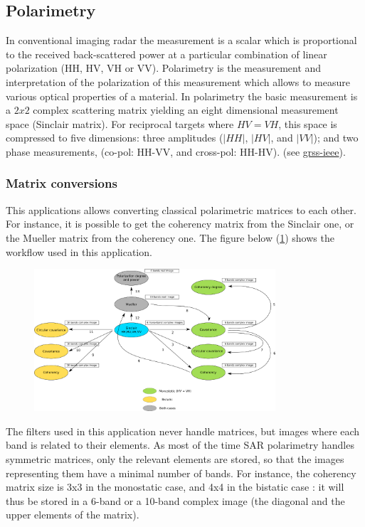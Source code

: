 \subsection{Polarimetry}

In conventional imaging radar the measurement is a scalar which is proportional
to the received back-scattered power at a particular combination of linear
polarization (HH, HV, VH or VV). 
Polarimetry is the measurement and interpretation of the polarization of this
measurement which allows to measure various optical properties of a material.
In polarimetry the basic measurement is a $2x2$ complex scattering matrix
yielding an eight dimensional measurement space (Sinclair matrix). For
reciprocal targets where $HV=VH$, this space is compressed to five dimensions:
three amplitudes ($|HH|$, $|HV|$, and $|VV|$); and two phase measurements,
(co-pol: HH-VV, and cross-pol:
HH-HV). (see \href{http://www.grss-ieee.org/technical-briefs/imaging-radar-polarimetry}{grss-ieee}).

\subsubsection{Matrix conversions}

This applications allows converting classical polarimetric matrices to each
other.  For instance, it is possible to get the coherency matrix from the
Sinclair one, or the Mueller matrix from the coherency one.  The figure below
(\ref{fig:polconv}) shows the workflow used in this application.

\begin{figure}[!h]
  \center
   \includegraphics[width=0.8\textwidth]{../Art/SARImages/sarpol_conversion_schema.png}
  \label{fig:polconv}
\end{figure}

The filters used in this application never handle matrices, but images where
each band is related to their elements.  As most of the time SAR polarimetry
handles symmetric matrices, only the relevant elements are stored, so that the
images representing them have a minimal number of bands.  For instance, the
coherency matrix size is 3x3 in the monostatic case, and 4x4 in the bistatic
case : it will thus be stored in a 6-band or a 10-band complex image (the
diagonal and the upper elements of the matrix).

